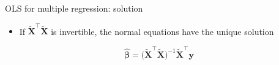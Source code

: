 \begin{frame}{OLS for multiple regression: solution}
    \begin{itemize}
        \item If $\tilde{\mathbf{X}}^\top \tilde{\mathbf{X}}$ is invertible, the normal equations have the unique solution
    \end{itemize}
    \[
        \hat{\symbf{\beta}} = \big(\tilde{\mathbf{X}}^\top \tilde{\mathbf{X}}\big)^{-1} \tilde{\mathbf{X}}^\top \mathbf{y}
    \]
\end{frame}


